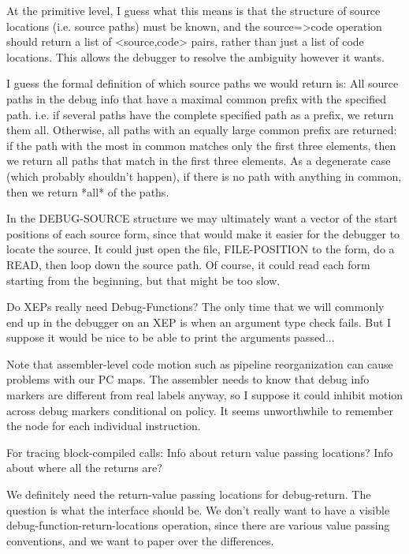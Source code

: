 At the primitive level, I guess what this means is that the structure of source
locations (i.e. source paths) must be known, and the source=>code operation
should return a list of <source,code> pairs, rather than just a list of code
locations.  This allows the debugger to resolve the ambiguity however it wants.

I guess the formal definition of which source paths we would return is:
    All source paths in the debug info that have a maximal common prefix with
    the specified path.  i.e. if several paths have the complete specified path
    as a prefix, we return them all.  Otherwise, all paths with an equally
    large common prefix are returned: if the path with the most in common
    matches only the first three elements, then we return all paths that match
    in the first three elements.  As a degenerate case (which probably
    shouldn't happen), if there is no path with anything in common, then we
    return *all* of the paths.



In the DEBUG-SOURCE structure we may ultimately want a vector of the start
positions of each source form, since that would make it easier for the debugger
to locate the source.  It could just open the file, FILE-POSITION to the form,
do a READ, then loop down the source path.  Of course, it could read each form
starting from the beginning, but that might be too slow.


Do XEPs really need Debug-Functions?  The only time that we will commonly end
up in the debugger on an XEP is when an argument type check fails.  But I
suppose it would be nice to be able to print the arguments passed...


Note that assembler-level code motion such as pipeline reorganization can cause
problems with our PC maps.  The assembler needs to know that debug info markers
are different from real labels anyway, so I suppose it could inhibit motion
across debug markers conditional on policy.  It seems unworthwhile to remember
the node for each individual instruction.


For tracing block-compiled calls:
    Info about return value passing locations?
    Info about where all the returns are?

We definitely need the return-value passing locations for debug-return.  The
question is what the interface should be.  We don't really want to have a
visible debug-function-return-locations operation, since there are various
value passing conventions, and we want to paper over the differences.


